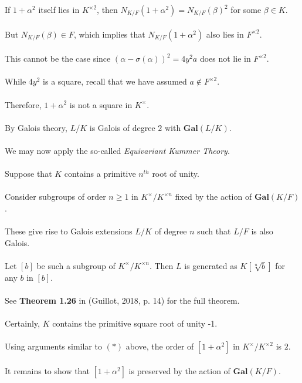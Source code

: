 \documentclass{article}
\begin{document}
\indent If $1 + \alpha^2$ itself lies in $K^{\times2}$, then $N_{K/F}(1 + \alpha^2) = N_{K/F}(\beta)^2$ for some $\beta \in K$. \\\\
\indent But $N_{K/F}(\beta) \in F$, which implies that $N_{K/F}(1 + \alpha^2)$ also lies in $F^{\times2}$. \\\\
\indent This cannot be the case since $(\alpha - \sigma(\alpha))^2 = 4y^2a$  does not lie in $F^{\times2}$. \\\\
\indent \indent While $4y^2$ is a square, recall that we have assumed $a \notin F^{\times2}$. \\\\
\indent Therefore, $1 + \alpha^2$ is not a square in $K^{\times}$. \\\\
\indent By Galois theory, $L/K$ is Galois of degree $2$ with $\textbf{Gal}(L/K)$. \\\\
\indent We may now apply the so-called \emph{Equivariant Kummer Theory}. \\\\
\indent \indent Suppose that $K$ contains a primitive $n^{th}$ root of unity. \\\\
\indent \indent Consider subgroups of order $n \geq 1$ in $K^\times/K^{\times n}$ fixed by the action of $\textbf{Gal}(K/F)$. \\\\
\indent \indent These give rise to Galois extensions $L/K$ of degree $n$ such that $L/F$ is also Galois. \\\\
\indent \indent Let $[b]$ be such a subgroup of $K^\times/K^{\times n}$. Then $L$ is generated as $K[\sqrt[n]{b}]$ for any $b$ in $[b]$.  \\\\
\indent \indent See \textbf{Theorem 1.26} in (Guillot, 2018, p. 14) for the full theorem. \\\\
\indent Certainly, $K$ contains the primitive square root of unity -1. \\\\
\indent Using arguments similar to $(\ast)$ above, the order of $[1 + \alpha^2]$ in $K^\times/K^{\times2}$ is $2$. \\\\
\indent It remains to show that $[1 + \alpha^2]$ is preserved by the action of $\textbf{Gal}(K/F)$. \\\\
\pagebreak
\end{document}
